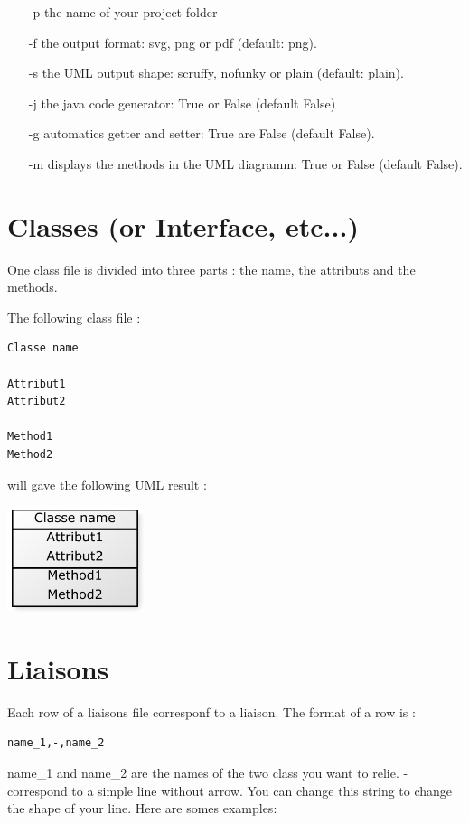 \documentclass[a4paper,11pt]{article}
\begin{document}
\begin{enumerate}
\item[-p] the name of your project folder
\item[-f] the output format: svg, png or pdf (default: png).
\item[-s] the UML output shape: scruffy, nofunky or plain (default: plain).
\item[-j] the java code generator: True or False (default False)
\item[-g] automatics getter and setter: True are False (default False).
\item[-m] displays the methods in the UML diagramm: True or False (default False).
\end{enumerate}

\section{Classes (or Interface, etc...)}
\label{module}
One class file is divided into three parts : the name, the attributs and the methods.

The following class file :
\begin{center}
\begin{verbatim}
Classe name

Attribut1
Attribut2

Method1
Method2
\end{verbatim}
\end{center}
will gave the following UML result :
\begin{center}
\includegraphics[width=4cm]{class}
\end{center}

\section{Liaisons}
\label{liaisons}
Each row of a liaisons file corresponf to a liaison. The format of a row is :
\begin{verbatim}
name_1,-,name_2
\end{verbatim}

name\_1 and name\_2 are the names of the two class you want to relie. - correspond to a simple line without arrow. You can change this string to change the shape of your line. Here are somes examples:
\end{document}

